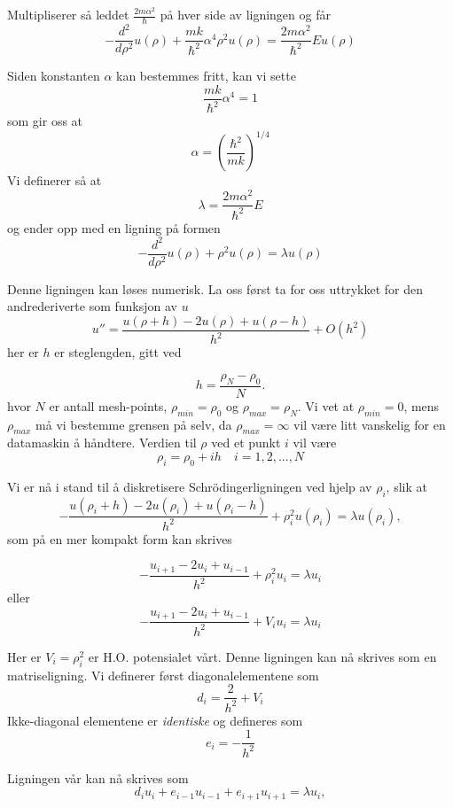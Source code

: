 \documentclass{article}
\begin{document}
Multipliserer så leddet $\frac{2m\alpha^2}{\hbar}$ på hver side av ligningen og får
\begin{equation}
  -\frac{d^2}{d\rho^2} u(\rho) 
       + \frac{mk}{\hbar^2} \alpha^4\rho^2u(\rho)  = \frac{2m\alpha^2}{\hbar^2}E u(\rho)
\end{equation}

Siden konstanten $\alpha$ kan bestemmes fritt, kan vi sette 
\[\frac{mk}{\hbar^2}\alpha^4 = 1 \]
som gir oss at
\[\alpha = \left(\frac{\hbar^2}{mk} \right)^{1/4} \]
Vi definerer så at
\[\lambda = \frac{2m\alpha^2}{\hbar^2}E \]
og ender opp med en ligning på formen
\begin{equation}
  -\frac{d^2}{d\rho^2} u(\rho) + \rho^2u(\rho)  = \lambda u(\rho)
\end{equation}

Denne ligningen kan løses numerisk. La oss først ta for oss uttrykket for den andrederiverte som funksjon av $u$
\begin{equation}
    u''=\frac{u(\rho+h) -2u(\rho) +u(\rho-h)}{h^2} +O(h^2)
\end{equation}
her er $h$ er steglengden, gitt ved

\begin{equation}
  h=\frac{\rho_N-\rho_0 }{N}.
\end{equation}
hvor $N$ er antall mesh-points, $\rho_{min} = \rho_0$ og $\rho_{max} = \rho_N$. Vi vet at $\rho_{min} = 0$, mens $\rho_{max}$ må vi bestemme grensen på selv, da $\rho_{max} = \infty$ vil være litt vanskelig for en datamaskin å håndtere. Verdien til $\rho$ ved et punkt $i$ vil være
\[\rho_i = \rho_0 + ih \quad i = 1,2,...,N \]

Vi er nå i stand til å diskretisere Schrödingerligningen ved hjelp av $\rho_i$, slik at 
\[
-\frac{u(\rho_i+h) -2u(\rho_i) +u(\rho_i-h)}{h^2}+\rho_i^2u(\rho_i)  = \lambda u(\rho_i),
\]
som på en mer kompakt form kan skrives 

\[ -\frac{u_{i+1} -2u_i +u_{i-1}}{h^2}+\rho_i^2u_i= \lambda u_i \]
eller
\[-\frac{u_{i+1} -2u_i +u_{i-1} }{h^2}+V_iu_i  = \lambda u_i  \]

Her er $V_i = \rho_i^2$ er H.O. potensialet vårt. Denne ligningen kan nå skrives som en matriseligning. Vi definerer først diagonalelementene som 
\[ d_i = \frac{2}{h^2} + V_i \]
Ikke-diagonal elementene er \textit{identiske} og defineres som
\[e_i = -\frac{1}{h^2} \]

Ligningen vår kan nå skrives som 
\begin{equation}
d_iu_i+e_{i-1}u_{i-1}+e_{i+1}u_{i+1}  = \lambda u_i,
\end{equation}
\end{document}

